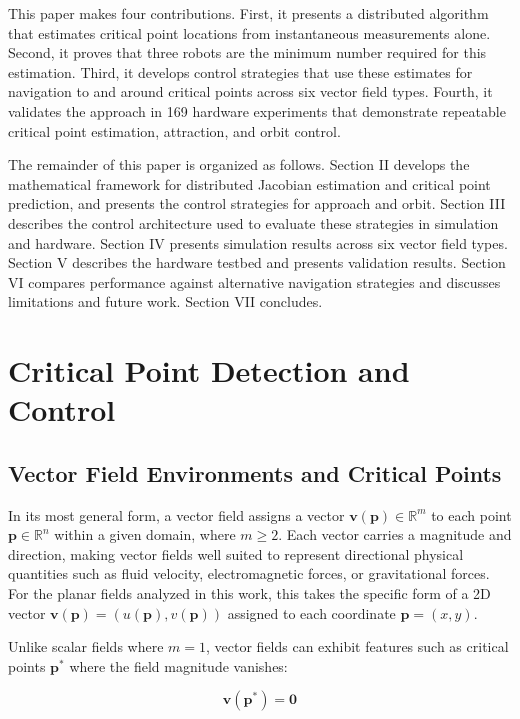 \documentclass[lettersize,journal]{IEEEtran}
\begin{document}
This paper makes four contributions. First, it presents a distributed algorithm that estimates critical point locations from instantaneous measurements alone. Second, it proves that three robots are the minimum number required for this estimation. Third, it develops control strategies that use these estimates for navigation to and around critical points across six vector field types. Fourth, it validates the approach in 169 hardware experiments that demonstrate repeatable critical point estimation, attraction, and orbit control.

The remainder of this paper is organized as follows. Section II develops the mathematical framework for distributed Jacobian estimation and critical point prediction, and presents the control strategies for approach and orbit. Section III describes the control architecture used to evaluate these strategies in simulation and hardware. Section IV presents simulation results across six vector field types. Section V describes the hardware testbed and presents validation results. Section VI compares performance against alternative navigation strategies and discusses limitations and future work. Section VII concludes.

\section{Critical Point Detection and Control}

\subsection{Vector Field Environments and Critical Points}

In its most general form, a vector field assigns a vector $\mathbf{v}(\mathbf{p}) \in \mathbb{R}^m$ to each point $\mathbf{p} \in \mathbb{R}^n$ within a given domain, where $m \geq 2$. Each vector carries a magnitude and direction, making vector fields well suited to represent directional physical quantities such as fluid velocity, electromagnetic forces, or gravitational forces. For the planar fields analyzed in this work, this takes the specific form of a 2D vector $\mathbf{v}(\mathbf{p}) = (u(\mathbf{p}), v(\mathbf{p}))$ assigned to each coordinate $\mathbf{p} = (x, y)$.

Unlike scalar fields where $m=1$, vector fields can exhibit features such as critical points $\mathbf{p}^*$ where the field magnitude vanishes:

\begin{equation}
\mathbf{v}(\mathbf{p}^*) = \mathbf{0}
\end{equation}
\end{document}
